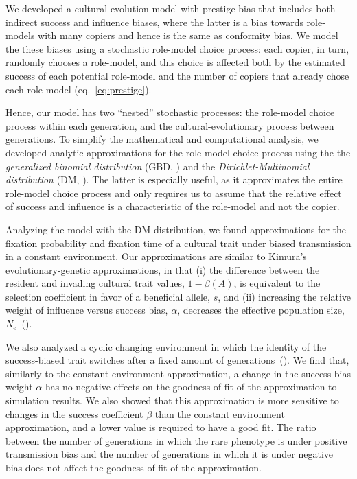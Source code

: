 \documentclass[12pt]{extarticle}
\begin{document}
We developed a cultural-evolution model with prestige bias that includes both indirect success and influence biases, where the latter is a bias towards role-models with many copiers {and hence is the same as conformity bias}.
We model the these biases using a stochastic role-model choice process: each copier, in {turn}, randomly chooses a role-model, and this choice is affected both by the estimated success of each potential role-model and the number of copiers that already chose each role-model (eq.~\ref{eq:prestige}). 

Hence, {our model has} two ``nested'' stochastic processes: the role-model choice process within each generation, and the cultural-evolutionary process between generations.
To simplify the mathematical and computational analysis, we developed analytic approximations for the role-model choice process using the the {\em generalized binomial distribution} (GBD, ) and the {\em Dirichlet-Multinomial distribution} (DM, ).
The latter is especially useful, as it approximates the entire role-model choice process and only requires us to assume that the relative effect of success and influence is a characteristic of the role-model and not the copier.

Analyzing the model with the DM distribution, we found approximations for the fixation probability and fixation time of a cultural trait under biased transmission in a constant environment.
Our approximations are similar to Kimura's evolutionary-genetic approximations, {in} that (i) the difference between the resident and invading cultural trait values, $1-\beta(A)$, is equivalent to the selection coefficient in favor of a beneficial allele, $s$, and (ii) increasing the relative weight of influence versus success bias, $\alpha$, decreases the effective population size, $N_e$~().

We also analyzed a cyclic changing environment in which the identity of the success-biased trait switches after a fixed amount of generations~().
We find that, similarly to the constant environment approximation, a change in the success-bias weight $\alpha$ has no negative effects on the goodness-of-fit of the approximation to simulation results.
We also showed that this approximation is more sensitive to changes in the success coefficient $\beta$ than the constant environment approximation, and a lower value is required to have a good fit. The ratio between the number of {generations} in which the rare phenotype is under positive transmission bias and the number of generations in which it is under negative bias does not affect the goodness-of-fit of the approximation. 
\end{document}
